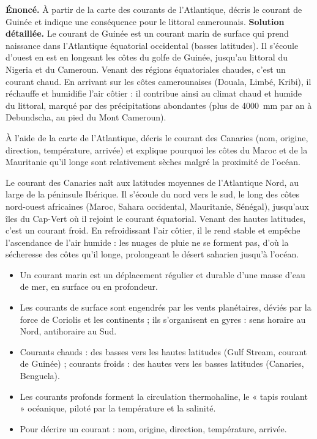 \documentclass[11pt]{article}
\begin{document}
\begin{exoresolu}
\textbf{Énoncé.} À partir de la carte des courants de l'Atlantique, décris le courant de Guinée et indique une conséquence pour le littoral camerounais.
\tcblower
\textbf{Solution détaillée.} Le courant de Guinée est un courant marin de surface qui prend naissance dans l'Atlantique équatorial occidental (basses latitudes). Il s'écoule d'ouest en est en longeant les côtes du golfe de Guinée, jusqu'au littoral du Nigeria et du Cameroun. Venant des régions équatoriales chaudes, c'est un courant chaud. En arrivant sur les côtes camerounaises (Douala, Limbé, Kribi), il réchauffe et humidifie l'air côtier : il contribue ainsi au climat chaud et humide du littoral, marqué par des précipitations abondantes (plus de \SI{4000}{mm} par an à Debundscha, au pied du Mont Cameroun).
\end{exoresolu}

\begin{exercice}
À l'aide de la carte de l'Atlantique, décris le courant des Canaries (nom, origine, direction, température, arrivée) et explique pourquoi les côtes du Maroc et de la Mauritanie qu'il longe sont relativement sèches malgré la proximité de l'océan.
\end{exercice}

\begin{corrige}[Exercice 1]
Le courant des Canaries naît aux latitudes moyennes de l'Atlantique Nord, au large de la péninsule Ibérique. Il s'écoule du nord vers le sud, le long des côtes nord-ouest africaines (Maroc, Sahara occidental, Mauritanie, Sénégal), jusqu'aux îles du Cap-Vert où il rejoint le courant équatorial. Venant des hautes latitudes, c'est un courant froid. En refroidissant l'air côtier, il le rend stable et empêche l'ascendance de l'air humide : les nuages de pluie ne se forment pas, d'où la sécheresse des côtes qu'il longe, prolongeant le désert saharien jusqu'à l'océan.
\end{corrige}

\begin{aretenir}
\begin{itemize}
\item Un courant marin est un déplacement régulier et durable d'une masse d'eau de mer, en surface ou en profondeur.
\item Les courants de surface sont engendrés par les vents planétaires, déviés par la force de Coriolis et les continents ; ils s'organisent en gyres : sens horaire au Nord, antihoraire au Sud.
\item Courants chauds : des basses vers les hautes latitudes (Gulf Stream, courant de Guinée) ; courants froids : des hautes vers les basses latitudes (Canaries, Benguela).
\item Les courants profonds forment la circulation thermohaline, le « tapis roulant » océanique, piloté par la température et la salinité.
\item Pour décrire un courant : nom, origine, direction, température, arrivée.
\end{itemize}
\end{aretenir}
\end{document}
